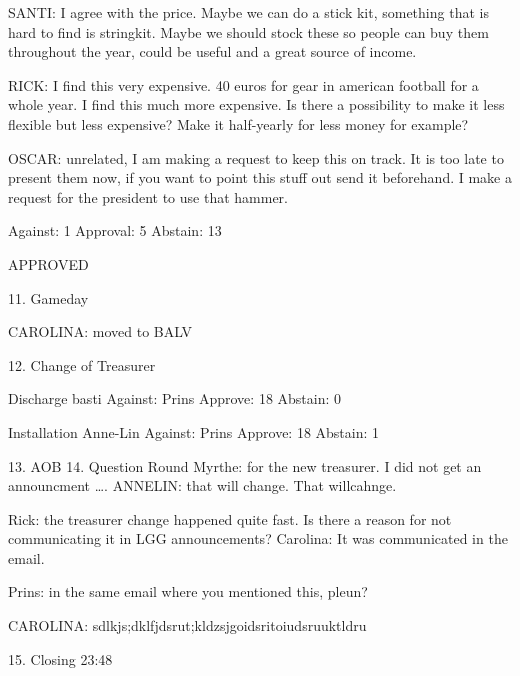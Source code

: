 \documentclass[12pt, a4paper]{article}
\begin{document}
SANTI: I agree with the price. Maybe we can do a stick kit, something that is hard to find is stringkit. Maybe we should stock these so people can buy them throughout the year, could be useful and a great source of income.

RICK: I find this very expensive. 40 euros for gear in american football for a whole year. I find this much more expensive. Is there a possibility to make it less flexible but less expensive? Make it half-yearly for less money for example?

OSCAR: unrelated, I am making a request to keep this on track. It is too late to present them now, if you want to point this stuff out send it beforehand. I make a request for the president to use that hammer.

Against: 1
Approval: 5
Abstain: 13

APPROVED

11. Gameday

CAROLINA: moved to BALV

12. Change of Treasurer

Discharge basti
Against: Prins
Approve: 18
Abstain: 0

Installation Anne-Lin
Against: Prins
Approve: 18
Abstain: 1

13. AOB
14. Question Round
Myrthe: for the new treasurer. I did not get an announcment ….
ANNELIN: that will change. That willcahnge.

Rick: the treasurer change happened quite fast. Is there a reason for not communicating it in LGG announcements?
Carolina: It was communicated in the email.

Prins: in the same email where you mentioned this, pleun?

CAROLINA: sdlkjs;dklfjdsrut;kldzsjgoidsritoiudsruuktldru

15. Closing
23:48
\end{document}
